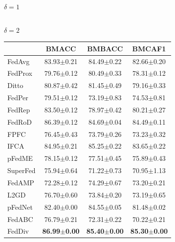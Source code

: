 \documentclass[journal]{IEEEtran}
\begin{document}
\begin{table}
\begin{subtable}[]{$\delta=1$}
\begin{tabular}{lccc}
			\bottomrule
		\end{tabular}
	\end{subtable}
	\centering
	\begin{subtable}[]{$\delta=2$}
		\begin{tabular}{lccc}
			\toprule  
			\specialrule{0em}{3pt}{1pt}  
			& BMACC                  & BMBACC                  & BMCAF1                  \\ \midrule
			FedAvg   & 83.93$\pm$0.21          & 84.49$\pm$0.22          & 82.66$\pm$0.20          \\
			FedProx  & 79.76$\pm$0.12          & 80.49$\pm$0.33          & 78.31$\pm$0.12          \\
			Ditto    & 80.87$\pm$0.42          & 81.45$\pm$0.49          & 79.16$\pm$0.33          \\
			FedPer   & 79.51$\pm$0.12          & 73.19$\pm$0.83          & 74.53$\pm$0.81          \\
			FedRep   & 83.50$\pm$0.12          & 78.97$\pm$0.42          & 80.21$\pm$0.27          \\
			FedRoD   & 86.39$\pm$0.12          & 84.69$\pm$0.04          & 84.49$\pm$0.11          \\
			FPFC     & 76.45$\pm$0.43          & 73.79$\pm$0.26          & 73.23$\pm$0.32          \\
			IFCA     & 84.95$\pm$0.21          & 85.25$\pm$0.22          & 83.65$\pm$0.22          \\
			pFedME   & 78.15$\pm$0.12          & 77.51$\pm$0.45          & 75.89$\pm$0.43          \\
			SuperFed & 75.94$\pm$0.64          & 71.22$\pm$0.73          & 70.95$\pm$1.13          \\
			FedAMP   & 72.28$\pm$0.12          & 74.29$\pm$0.67          & 73.20$\pm$0.21          \\
			L2GD   & 76.70$\pm$0.60          & 73.84$\pm$0.20          & 73.19$\pm$0.65          \\
			pFedNet  & 82.40$\pm$0.00          & 84.55$\pm$0.05          & 81.48$\pm$0.02          \\
			FedABC   & 76.79$\pm$0.21          & 72.31$\pm$0.22          & 70.22$\pm$0.21          \\ %
			FedDiv   & \textbf{86.99$\pm$0.00} & \textbf{85.40$\pm$0.00} & \textbf{85.30$\pm$0.00} \\ 
			\bottomrule 
		\end{tabular}
	\end{subtable}
	\centering
	\\

\end{table}
\end{document}
